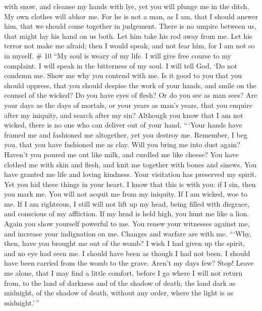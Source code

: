 with snow, and cleanse my hands with lye,  yet you will
plunge me in the ditch. My own clothes will abhor me.  For
he is not a man, as I am, that I should answer him, that we should come
together in judgement.  There is no umpire between us, that
might lay his hand on us both.  Let him take his rod away
from me. Let his terror not make me afraid;  then I would
speak, and not fear him, for I am not so in myself. \# 10 
``My soul is weary of my life. I will give free course to my complaint.
I will speak in the bitterness of my soul.  I will tell God,
`Do not condemn me. Show me why you contend with me.  Is it
good to you that you should oppress, that you should despise the work of
your hands, and smile on the counsel of the wicked?  Do you
have eyes of flesh? Or do you see as man sees?  Are your
days as the days of mortals, or your years as man's years, 
that you enquire after my iniquity, and search after my sin?
 Although you know that I am not wicked, there is no one who
can deliver out of your hand.  ``\,`Your hands have framed
me and fashioned me altogether, yet you destroy me. 
Remember, I beg you, that you have fashioned me as clay. Will you bring
me into dust again?  Haven't you poured me out like milk,
and curdled me like cheese?  You have clothed me with skin
and flesh, and knit me together with bones and sinews.  You
have granted me life and loving kindness. Your visitation has preserved
my spirit.  Yet you hid these things in your heart. I know
that this is with you:  if I sin, then you mark me. You
will not acquit me from my iniquity.  If I am wicked, woe
to me. If I am righteous, I still will not lift up my head, being filled
with disgrace, and conscious of my affliction.  If my head
is held high, you hunt me like a lion. Again you show yourself powerful
to me.  You renew your witnesses against me, and increase
your indignation on me. Changes and warfare are with me. 
```Why, then, have you brought me out of the womb? I wish I had given up
the spirit, and no eye had seen me.  I should have been as
though I had not been. I should have been carried from the womb to the
grave.  Aren't my days few? Stop! Leave me alone, that I
may find a little comfort,  before I go where I will not
return from, to the land of darkness and of the shadow of death;
 the land dark as midnight, of the shadow of death, without
any order, where the light is as midnight.'\,''

